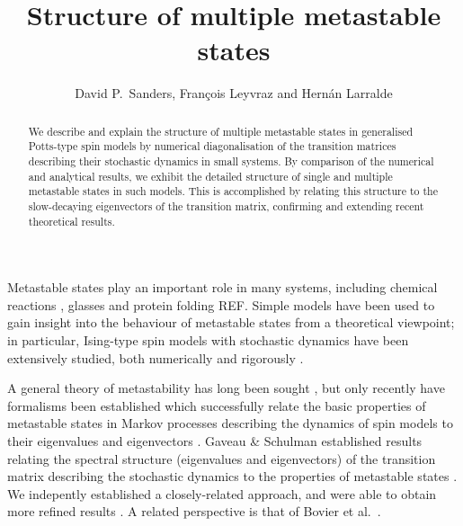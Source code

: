 \documentclass[10pt]{article}
\title{\vspace*{-60pt}Structure of multiple metastable states}
\author{David P.~Sanders, Fran\c{c}ois Leyvraz and Hern\'an Larralde}
\begin{document}
\maketitle

\begin{abstract}

We describe and explain the structure of multiple metastable states in generalised Potts-type 
spin models by numerical diagonalisation of the transition matrices 
describing their stochastic dynamics in small systems.
By comparison of the numerical and analytical results, 
we
exhibit the detailed structure of single and multiple metastable states in such
models.
This is accomplished by relating this structure to the slow-decaying
eigenvectors of the transition matrix, confirming and extending recent
theoretical results.
% 

\end{abstract}


Metastable states play an important role in many systems, including chemical
reactions \cite{WalesBook}, glasses \cite{DebenedettiBook} and protein folding
REF.
Simple models have been used to gain insight into the behaviour of metastable
states from a theoretical viewpoint;  in particular, Ising-type spin models with
stochastic dynamics have been extensively studied,
both numerically \cite{RikvoldLifetimes1994} and rigorously
\cite{NevesSchonmannCMP}.

A general theory of metastability has long been
sought \cite{PenroseLebowitz1971}, but only recently have formalisms been
established which successfully relate the basic properties
of metastable states in Markov processes describing
the dynamics of spin models to their eigenvalues and eigenvectors \cite{GaveauSchulmanJMP1998}. 
Gaveau \& Schulman  \cite{GaveauSchulmanJMP1998} established results relating
the spectral structure (eigenvalues and eigenvectors) of the transition matrix
describing the stochastic dynamics to the properties of metastable states
\cite{GaveauSchulmanMultiplePhasesPRE2006}. 
We indepently established a closely-related approach, and were able to obtain
more refined results
\cite{LarraldeLeyvraz2005, LarraldeLeyvrazSandersJStatMech2006}. A related
perspective is that of Bovier et al.\ \cite{BovierCMP2002}.
\end{document}
